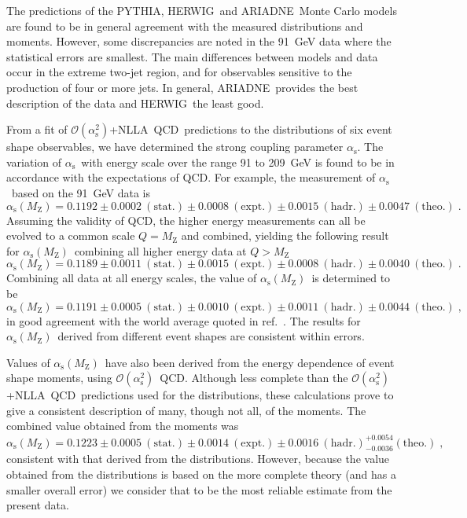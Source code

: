 \documentclass[12pt,a4paper,twoside]{article}
\newcommand{\as}     {\ensuremath{\alpha_{\mathrm{s}}}}
\newcommand{\asmz}   {\ensuremath{\alpha_{\mathrm{s}}(\mz)}}
\newcommand{\oaa}    {\ensuremath{\mathcal{O}(\alpha_{\mathrm{s}}^2)}}
\newcommand{\mz}     {\ensuremath{M_{\mathrm{Z}}}}
\newcommand{\qcd}{\mbox{QCD}}
\newcommand{\nlla}{\mbox{NLLA}}
\newcommand{\Herwig}{\mbox{HERWIG}}
\newcommand{\Pythia}{\mbox{PYTHIA}}
\newcommand{\Ariadne}{\mbox{ARIADNE}}
\begin{document}
The predictions
of the \Pythia, \Herwig\ and \Ariadne\ Monte Carlo models are found to be
in general agreement with the measured distributions and moments.  
However, some 
discrepancies are noted in the 91~GeV data where the statistical errors 
are smallest.  The main differences between models and data occur in
the extreme two-jet region, and for observables sensitive to
the production of four or more jets.  In general, \Ariadne\ provides
the best description of the data and \Herwig\ the least good. 

From a fit of \oaa+\nlla\ \qcd\ predictions to the distributions of
six event shape observables,
we have determined the strong coupling parameter $\as$.
The variation of \as\ with energy scale over the range 91 to 209~GeV
is found to be in accordance with the expectations of \qcd.
For example, the measurement of \as\ based on the 91~GeV data is
\[
\asmz =  0.1192
\pm0.0002~\mathrm{(stat.)}
\pm0.0008~\mathrm{(expt.)}
\pm0.0015~\mathrm{(hadr.)}
\pm0.0047~\mathrm{(theo.)} \;.
\]
Assuming the validity of \qcd, the higher energy measurements can all 
be evolved to a common scale $Q=\mz$ and combined, yielding
the following result for \asmz\ combining all 
higher energy data at $Q>\mz$
\[
\asmz =  0.1189
\pm0.0011~\mathrm{(stat.)}
\pm0.0015~\mathrm{(expt.)}
\pm0.0008~\mathrm{(hadr.)}
\pm0.0040~\mathrm{(theo.)}\;. 
\]
Combining all data at all energy scales, the value of \asmz\ is determined to be
\[ \asmz  =  0.1191
\pm0.0005~\mathrm{(stat.)}
\pm0.0010~\mathrm{(expt.)}
\pm0.0011~\mathrm{(hadr.)}
\pm0.0044~\mathrm{(theo.)}
 \;,\]
in good agreement with the world average quoted in ref.~\cite{pdg04}.
The results for \asmz\ derived 
from different event shapes are consistent within
errors.  
%
%
\par
Values of \asmz\ have also been derived from the energy dependence
of event shape moments, using \oaa\ \qcd.  Although less complete
than the \oaa+\nlla\ \qcd\ predictions used for the distributions, 
these calculations prove to give a consistent description of many, 
though not all, of the moments.   The combined value obtained from
the moments was
\mbox{$\asmz =  0.1223
\pm0.0005~\mathrm{(stat.)}
\pm0.0014~\mathrm{(expt.)}
\pm0.0016~\mathrm{(hadr.)}
^{+0.0054}
_{-0.0036}
\mathrm{(theo.)}\;,
$}
consistent with that derived from the
distributions. 
However, because the value obtained from
the distributions is based on the more complete theory (and has a smaller
overall error) we consider that to be the most reliable estimate 
from the present data.  
\end{document}
